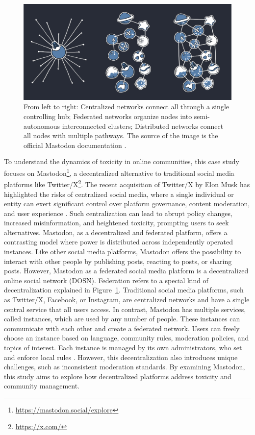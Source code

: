 \begin{figure}[tb]
  \centering
  \includegraphics[width=\textwidth]{../material/network_models.jpg}
  \caption[mastodon]{From left to right: Centralized networks connect all through a single controlling hub; Federated networks organize nodes into semi-autonomous interconnected clusters; Distributed networks connect all nodes with multiple pathways. The source of the image is the official Mastodon documentation \cite{mastodon:docs}.}
  \label{network-models}
\end{figure}

To understand the dynamics of toxicity in online communities, this case study focuses on Mastodon\footnote{\url{https://mastodon.social/explore}}, a decentralized alternative to traditional social media platforms like Twitter/X\footnote{\url{https://x.com/}}. The recent acquisition of Twitter/X by Elon Musk has highlighted the risks of centralized social media, where a single individual or entity can exert significant control over platform governance, content moderation, and user experience \cite{he:2023}. Such centralization can lead to abrupt policy changes, increased misinformation, and heightened toxicity, prompting users to seek alternatives. Mastodon, as a decentralized and federated platform, offers a contrasting model where power is distributed across independently operated instances. Like other social media platforms, Mastodon offers the possibility to interact with other people by publishing posts, reacting to posts, or sharing posts. However, Mastodon as a federated social media platform is a decentralized online social network (DOSN). Federation refers to a special kind of decentralization explained in Figure~\ref{network-models}. Traditional social media platforms, such as Twitter/X, Facebook, or Instagram, are centralized networks and have a single central service that all users access. In contrast, Mastodon has multiple services, called instances, which are used by any number of people. These instances can communicate with each other and create a federated network. Users can freely choose an instance based on language, community rules, moderation policies, and topics of interest. Each instance is managed by its own administrators, who set and enforce local rules \cite{mastodon:docs}. However, this decentralization also introduces unique challenges, such as inconsistent moderation standards. By examining Mastodon, this study aims to explore how decentralized platforms address toxicity and community management.

